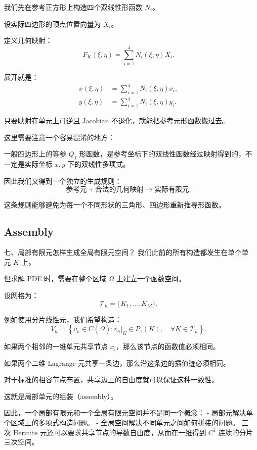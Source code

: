 我们先在参考正方形上构造四个双线性形函数 \(N_i\)。

设实际四边形的顶点位置向量为 \(X_i\)。

定义几何映射：
\[
    \boxed{
        F_K(\xi,\eta)
        =\sum_{i=1}^4N_i(\xi,\eta)X_i.
    }
\]

展开就是：
\[
    \begin{aligned}
        x(\xi,\eta) & =\sum_{i=1}^4N_i(\xi,\eta)x_i, \\
        y(\xi,\eta) & =\sum_{i=1}^4N_i(\xi,\eta)y_i.
    \end{aligned}
\]

只要映射在单元上可逆且 Jacobian 不退化，就能把参考元形函数搬过去。

这里需要注意一个容易混淆的地方：

一般四边形上的等参 \(Q_1\) 形函数，是参考坐标下的双线性函数经过映射得到的，不一定是实际坐标 \(x,y\) 下的双线性多项式。

因此我们又得到一个独立的生成规则：
\[
    \boxed{
        \text{参考元}+\text{合法的几何映射}
        \longrightarrow
        \text{实际有限元}.
    }
\]

这条规则能够避免为每一个不同形状的三角形、四边形重新推导形函数。


\subsection{Assembly}
七、局部有限元怎样生成全局有限元空间？
我们此前的所有构造都发生在单个单元 \(K\) 上。

但求解 PDE 时，需要在整个区域 \(\Omega\) 上建立一个函数空间。

设网格为：
\[
    \mathcal T_h=\{K_1,\ldots,K_M\}.
\]

例如使用分片线性元，我们希望构造：
\[
    V_h=
    \left\{
    v_h\in C(\overline\Omega):
    v_h|_K\in P_1(K),\quad
    \forall K\in\mathcal T_h
    \right\}.
\]

如果两个相邻的一维单元共享节点 \(x_i\)，那么该节点的函数值必须相同。

如果两个二维 Lagrange 元共享一条边，那么沿这条边的插值迹必须相同。

对于标准的相容节点布置，共享边上的自由度就可以保证这种一致性。

这就是局部单元的组装（assembly）。

因此，一个局部有限元和一个全局有限元空间并不是同一个概念：
- 局部元解决单个区域上的多项式构造问题。
- 全局空间解决不同单元之间如何拼接的问题。
三次 Hermite 元还可以要求共享节点的导数自由度，从而在一维得到 \(C^1\) 连续的分片三次空间。



